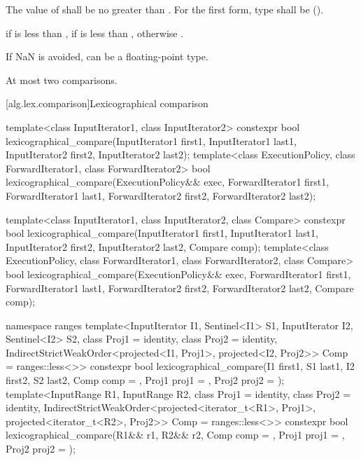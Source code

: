 \begin{itemdescr}
\pnum
\requires
The value of  shall be no greater than .
For the first form, type 
shall be  ().

\pnum
\returns
{} if  is less than ,
 if  is less than ,
otherwise .

\pnum
\begin{note}
If NaN is avoided,  can be a floating-point type.
\end{note}

\pnum
\complexity
At most two comparisons.
\end{itemdescr}

[alg.lex.comparison]{Lexicographical comparison}

%
\begin{itemdecl}
template<class InputIterator1, class InputIterator2>
  constexpr bool
    lexicographical_compare(InputIterator1 first1, InputIterator1 last1,
                            InputIterator2 first2, InputIterator2 last2);
template<class ExecutionPolicy, class ForwardIterator1, class ForwardIterator2>
  bool
    lexicographical_compare(ExecutionPolicy&& exec,
                            ForwardIterator1 first1, ForwardIterator1 last1,
                            ForwardIterator2 first2, ForwardIterator2 last2);

template<class InputIterator1, class InputIterator2, class Compare>
  constexpr bool
    lexicographical_compare(InputIterator1 first1, InputIterator1 last1,
                            InputIterator2 first2, InputIterator2 last2,
                            Compare comp);
template<class ExecutionPolicy, class ForwardIterator1, class ForwardIterator2,
         class Compare>
  bool
    lexicographical_compare(ExecutionPolicy&& exec,
                            ForwardIterator1 first1, ForwardIterator1 last1,
                            ForwardIterator2 first2, ForwardIterator2 last2,
                            Compare comp);

namespace ranges {
  template<InputIterator I1, Sentinel<I1> S1, InputIterator I2, Sentinel<I2> S2,
      class Proj1 = identity, class Proj2 = identity,
      IndirectStrictWeakOrder<projected<I1, Proj1>, projected<I2, Proj2>> Comp = ranges::less<>>
    constexpr bool
      lexicographical_compare(I1 first1, S1 last1, I2 first2, S2 last2,
                              Comp comp = {}, Proj1 proj1 = {}, Proj2 proj2 = {});
  template<InputRange R1, InputRange R2, class Proj1 = identity,
      class Proj2 = identity,
      IndirectStrictWeakOrder<projected<iterator_t<R1>, Proj1>,
        projected<iterator_t<R2>, Proj2>> Comp = ranges::less<>>
    constexpr bool
      lexicographical_compare(R1&& r1, R2&& r2, Comp comp = {},
                              Proj1 proj1 = {}, Proj2 proj2 = {});
}
\end{itemdecl}

